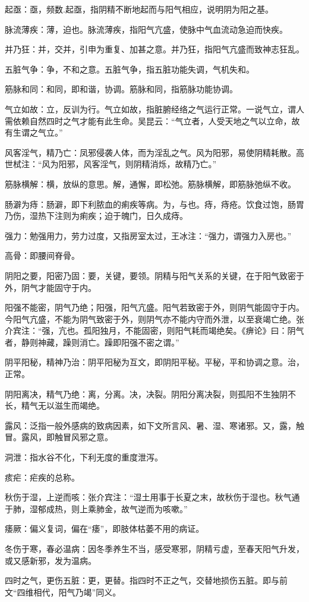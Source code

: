 \documentclass[draft,12pt]{ctexbook}
\begin{document}
\begin{jiaozhu}
  \item 起亟：亟，频数.起亟，指阴精不断地起而与阳气相应，说明阴为阳之基。
  \item 脉流薄疾：薄，迫也。脉流薄疾，指阳气亢盛，使脉中气血流动急迫而快疾。
  \item 并乃狂：并，交并，引申为重复、加甚之意。并乃狂，指阳气亢盛而致神志狂乱。
  \item 五脏气争：争，不和之意。五脏气争，指五脏功能失调，气机失和。
  \item 筋脉和同：和同，即和谐，协调。筋脉和同，指筋脉功能协调。
  \item 气立如故：立，反训为行。气立如故，指脏腑经络之气运行正常。一说气立，谓人需依赖自然四时之气才能有此生命。吴昆云：“气立者，人受天地之气以立命，故有生谓之气立。”
  \item 风客淫气，精乃亡：凤邪侵袭人体，而为淫乱之气。风为阳邪，易使阴精耗散。高世栻注：“风为阳邪，风客淫气，则阴精消烁，故精乃亡。”
  \item 筋脉横解：横，放纵的意思。解，通懈，即松弛。筋脉横解，即筋脉弛纵不收。
  \item 肠澼为痔：肠澼，即下利脓血的痢疾等病。为，与也。痔，痔疮。饮食过饱，肠胃乃伤，湿热下注则为痢疾；迫于魄门，日久成痔。
  \item 强力：勉强用力，劳力过度，又指房室太过，王冰注：“强力，谓强力入房也。”
  \item 高骨：即腰间脊骨。
  \item 阴阳之要，阳密乃固：要，关键，要领。阴精与阳气关系的关键，在于阳气致密于外，阴气才能固守于内。
  \item 阳强不能密，阴气乃绝；阳强，阳气亢盛。阳气若致密于外，则阴气能固守于内。今阳气亢盛，不能为阴气致密于外，则阴气亦不能内守而外泄，以至衰竭亡绝。张介宾注：“强，亢也。孤阳独月，不能固密，则阳气耗而竭绝矣。《痹论》曰：阴气者，静则神藏，躁则消亡。躁即阳强不密之谓。”
  \item 阴平阳秘，精神乃治：阴平阳秘为互文，即阴阳平秘。平秘，平和协调之意。治，正常。
  \item 阴阳离决，精气乃绝：离，分离。决，决裂。阴阳分离决裂，则孤阳不生独阴不长，精气无以滋生而竭绝。
  \item 露风：泛指一般外感病的致病因素，如下文所言风、暑、湿、寒诸邪。又，露，触冒。露风，即触冒风邪之意。
  \item 洞泄：指水谷不化，下利无度的重度泄泻。
  \item 痎疟：疟疾的总称。
  \item 秋伤于湿，上逆而咳：张介宾注：“湿土用事于长夏之末，故秋伤于湿也。秋气通于肺，湿郁成热，则上乘肺金，故气逆而为咳嗽。”
  \item 痿厥：偏义复词，偏在“痿”，即肢体枯萎不用的病证。
  \item 冬伤于寒，春必温病：因冬季养生不当，感受寒邪，阴精亏虚，至春天阳气升发，或又感新邪，发为温病。
  \item 四时之气，更伤五脏：更，更替。指四时不正之气，交替地损伤五脏。即与前文“四维相代，阳气乃竭”同义。
\end{jiaozhu}
\end{document}
